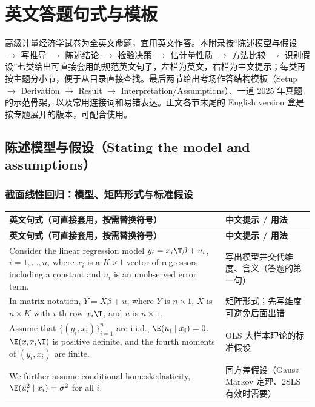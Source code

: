 \chapter{英文答题句式与模板}
\label{ch:UappC-english}

高级计量经济学试卷为全英文命题，宜用英文作答。本附录按“陈述模型与假设 $\to$ 写推导 $\to$ 陈述结论 $\to$ 检验决策 $\to$ 估计量性质 $\to$ 方法比较 $\to$ 识别假设”七类给出可直接套用的规范英文句子，左栏为英文，右栏为中文提示；每类再按主题分小节，便于从目录直接查找。最后两节给出考场作答结构模板（Setup $\to$ Derivation $\to$ Result $\to$ Interpretation/Assumptions）、一道 2025 年真题的示范骨架，以及常用连接词和易错表达。正文各节末尾的 English version 盒是按专题展开的版本，可配合使用。

\section{陈述模型与假设（Stating the model and assumptions）}\label{sec:UappC-model}

\subsection{截面线性回归：模型、矩阵形式与标准假设}

{\renewcommand{\arraystretch}{1.15}\begin{longtable}{@{}>{\raggedright\arraybackslash}p{11.4cm}>{\raggedright\arraybackslash\small}p{4.3cm}@{}}
\toprule
\textbf{英文句式（可直接套用，按需替换符号）} & \textbf{中文提示 / 用法}\\
\midrule
\endfirsthead
\toprule
\textbf{英文句式（可直接套用，按需替换符号）} & \textbf{中文提示 / 用法}\\
\midrule
\endhead
\bottomrule
\endlastfoot
Consider the linear regression model $y_i=x_i\T\beta+u_i$, $i=1,\dots,n$, where $x_i$ is a $K\times 1$ vector of regressors including a constant and $u_i$ is an unobserved error term. & 写出模型并交代维度、含义（答题的第一句）\\
\addlinespace[2pt]
In matrix notation, $Y=X\beta+u$, where $Y$ is $n\times 1$, $X$ is $n\times K$ with $i$-th row $x_i\T$, and $u$ is $n\times 1$. & 矩阵形式；先写维度可避免后面出错\\
\addlinespace[2pt]
Assume that $\{(y_i,x_i)\}_{i=1}^n$ are i.i.d., $\E(u_i\mid x_i)=0$, $\E(x_ix_i\T)$ is positive definite, and the fourth moments of $(y_i,x_i)$ are finite. & OLS 大样本理论的标准假设\\
\addlinespace[2pt]
We further assume conditional homoskedasticity, $\E(u_i^2\mid x_i)=\sigma^2$ for all $i$. & 同方差假设（Gauss–Markov 定理、2SLS 有效时需要）\\
\end{longtable}}


